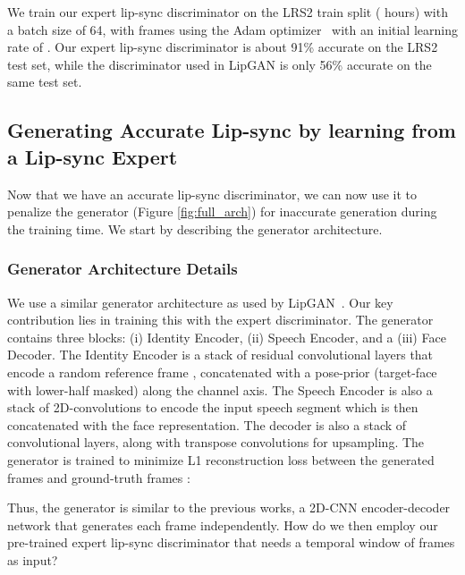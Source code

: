 \documentclass[sigconf]{acmart}
\begin{document}
We train our expert lip-sync discriminator on the LRS2 train split ( hours) with a batch size of 64, with  frames using the Adam optimizer~\cite{duchi2011adaptive} with an initial learning rate of . Our expert lip-sync discriminator is about 91\% accurate on the LRS2 test set, while the discriminator used in LipGAN is only 56\% accurate on the same test set. 

\subsection{Generating Accurate Lip-sync by learning from a Lip-sync Expert}
Now that we have an accurate lip-sync discriminator, we can now use it to penalize the generator (Figure \ref{fig:full_arch}) for inaccurate generation during the training time. We start by describing the generator architecture. 

\subsubsection{Generator Architecture Details} We use a similar generator architecture as used by LipGAN~\cite{kr2019towards}. Our key contribution lies in training this with the expert discriminator. The generator  contains three blocks: (i) Identity Encoder, (ii) Speech Encoder, and a (iii) Face Decoder. The Identity Encoder is a stack of residual convolutional layers that encode a random reference frame , concatenated with a pose-prior  (target-face with lower-half masked) along the channel axis. The Speech Encoder is also a stack of 2D-convolutions to encode the input speech segment  which is then concatenated with the face representation. The decoder is also a stack of convolutional layers, along with transpose convolutions for upsampling. The generator is trained to minimize L1 reconstruction loss between the generated frames  and ground-truth frames :



Thus, the generator is similar to the previous works, a 2D-CNN encoder-decoder network that generates each frame independently. How do we then employ our pre-trained expert lip-sync discriminator that needs a temporal window of  frames as input?
\end{document}
